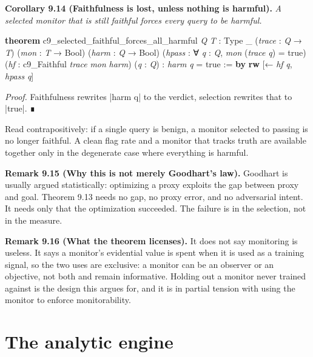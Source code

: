 \documentclass{memoir}
\begin{document}
\textbf{Corollary 9.14 (Faithfulness is lost, unless nothing is harmful).} \emph{A selected monitor
that is still faithful forces every query to be harmful.}

\begin{LeanVerbatim}
\textbf{theorem} c9_selected_faithful_forces_all_harmful
    \textit{Q} \textit{T} : Type _
    (\textit{trace} : \textit{Q} → \textit{T}) (\textit{mon} : \textit{T} → Bool) (\textit{harm} : \textit{Q} → Bool)
    (\textit{hpass} : ∀ \textit{q} : \textit{Q}, \textit{mon} (\textit{trace} \textit{q}) = true)
    (\textit{hf} : c9_Faithful \textit{trace} \textit{mon} \textit{harm})
    (\textit{q} : \textit{Q}) : \textit{harm} \textit{q} = true := \textbf{by}
  \textbf{rw} [← \textit{hf} \textit{q}, \textit{hpass} \textit{q}]

\end{LeanVerbatim}


\emph{Proof.} Faithfulness rewrites \LeanVerb|harm q| to the verdict, selection rewrites that to
\LeanVerb|true|. ∎

Read contrapositively: if a single query is benign, a monitor selected to
passing is no longer faithful. A clean flag rate and a monitor that tracks truth
are available together only in the degenerate case where everything is harmful.

\textbf{Remark 9.15 (Why this is not merely Goodhart's law).} Goodhart is usually argued
statistically: optimizing a proxy exploits the gap between proxy and goal.
Theorem 9.13 needs no gap, no proxy error, and no adversarial intent. It needs
only that the optimization succeeded. The failure is in the selection, not in
the measure.

\textbf{Remark 9.16 (What the theorem licenses).} It does not say monitoring is useless. It says
a monitor's evidential value is spent when it is used as a training signal, so
the two uses are exclusive: a monitor can be an observer or an objective, not
both and remain informative. Holding out a monitor never trained against is the
design this argues for, and it is in partial tension with using the monitor to
enforce monitorability.



\section{The analytic engine}\label{Two--Schemas--of--Impossibility-005F-005F-005F--Machine--Checked--Limits--of--Trustworthy--Machine--Learning-005F-005F-005F--and--Why--They--Tighten--with--Capability----The--Trace--Is--Not--a--Window----The--analytic--engine}
\end{document}
